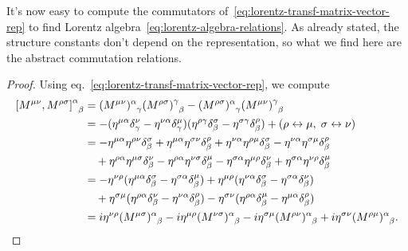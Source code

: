 It's now easy to compute the commutators of~\eqref{eq:lorentz-transf-matrix-vector-rep} to find Lorentz algebra~\eqref{eq:lorentz-algebra-relations}. As already stated, the structure constants don't depend on the representation, so what we find here are the abstract commutation relations.
\begin{proof}
    Using eq.~\eqref{eq:lorentz-transf-matrix-vector-rep}, we compute
    \begin{equation*}
    \begin{split}
        \tensor{\comm{M^{\mu\nu}}{M^{\rho\sigma}}}{^\alpha_\beta} &= \tensor{(M^{\mu\nu})}{^\alpha_\gamma} \tensor{(M^{\rho\sigma})}{^\gamma_\beta} - \tensor{(M^{\rho\sigma})}{^\alpha_\gamma} \tensor{(M^{\mu\nu})}{^\gamma_\beta}  \\
        &= - (\eta^{\mu\alpha} \delta^\nu_\gamma - \eta^{\nu\alpha} \delta^\mu_\gamma) (\eta^{\rho\gamma} \delta^\sigma_\beta - \eta^{\sigma\gamma} \delta^\rho_\beta) + (\rho \leftrightarrow \mu, \; \sigma \leftrightarrow \nu) \\
        & = -\eta^{\mu\alpha} \eta^{\rho\nu} \delta^\sigma_\beta + \eta^{\mu\alpha} \eta^{\sigma\nu} \delta^\rho_\beta + \eta^{\nu\alpha} \eta^{\rho\mu} \delta^\sigma_\beta - \eta^{\nu\alpha} \eta^{\sigma\mu} \delta^\rho_\beta \\
        &\quad + \eta^{\rho\alpha} \eta^{\mu\sigma} \delta^\nu_\beta - \eta^{\rho\alpha} \eta^{\nu\sigma} \delta^\mu_\beta - \eta^{\sigma\alpha} \eta^{\mu\rho} \delta^\nu_\beta + \eta^{\sigma\alpha} \eta^{\nu\rho} \delta^\mu_\beta \\
        &= - \eta^{\nu\rho} ( \eta^{\mu\alpha} \delta^\sigma_\beta - \eta^{\sigma\alpha} \delta^\mu_\beta ) + \eta^{\mu\rho} ( \eta^{\nu\alpha} \delta^\sigma_\beta - \eta^{\sigma\alpha} \delta^\nu_\beta ) \\
        &\quad + \eta^{\sigma\mu} ( \eta^{\rho\alpha} \delta^\nu_\beta - \eta^{\nu\alpha} \delta^\rho_\beta) - \eta^{\sigma\nu} (\eta^{\rho\alpha} \delta^\mu_\beta - \eta^{\mu\alpha} \delta^\rho_\beta) \\
        &= i  \eta^{\nu\rho} \tensor{(M^{\mu\sigma})}{^\alpha_\beta}  - i \eta^{\mu\rho} \tensor{(M^{\nu\sigma})}{^\alpha_\beta} - i \eta^{\sigma\mu}  \tensor{(M^{\rho\nu})}{^\alpha_\beta} +  i \eta^{\sigma\nu} \tensor{(M^{\rho\mu})}{^\alpha_\beta} . \qedhere
    \end{split}
    \end{equation*}
\end{proof}

